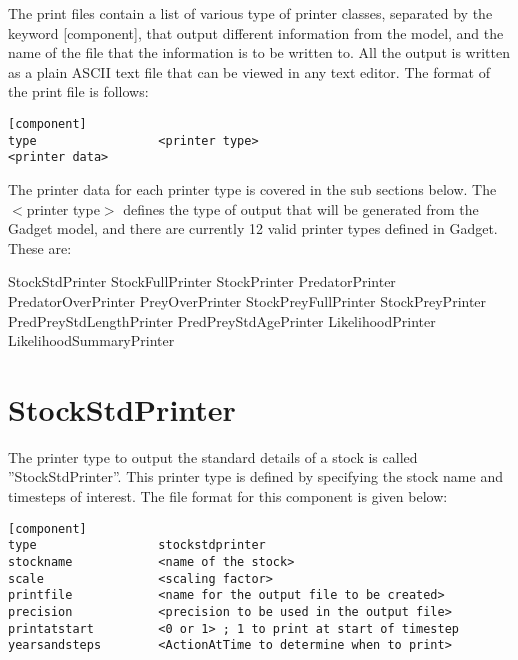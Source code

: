 \documentclass[10pt,twoside]{book}
\begin{document}
The print files contain a list of various type of printer classes, separated by the keyword [component], that output different information from the model, and the name of the file that the information is to be written to.  All the output is written as a plain ASCII text file that can be viewed in any text editor.  The format of the print file is follows:

{\small\begin{verbatim}
[component]
type                 <printer type>
<printer data>
\end{verbatim}}

The printer data for each printer type is covered in the sub sections below.  The $<$printer type$>$ defines the type of output that will be generated from the Gadget model, and there are currently 12 valid printer types defined in Gadget.  These are:

\bigskip
StockStdPrinter\newline
StockFullPrinter\newline
StockPrinter\newline
PredatorPrinter\newline
PredatorOverPrinter\newline
PreyOverPrinter\newline
StockPreyFullPrinter\newline
StockPreyPrinter\newline
PredPreyStdLengthPrinter\newline
PredPreyStdAgePrinter\newline
LikelihoodPrinter\newline
LikelihoodSummaryPrinter

\newpage %
\section{StockStdPrinter}\label{sec:stockstdprinter}
The printer type to output the standard details of a stock is called ''StockStdPrinter''.  This printer type is defined by specifying the stock name and timesteps of interest.  The file format for this component is given below:

{\small\begin{verbatim}
[component]
type                 stockstdprinter
stockname            <name of the stock>
scale                <scaling factor>
printfile            <name for the output file to be created>
precision            <precision to be used in the output file>
printatstart         <0 or 1> ; 1 to print at start of timestep
yearsandsteps        <ActionAtTime to determine when to print>
\end{verbatim}}
\end{document}
